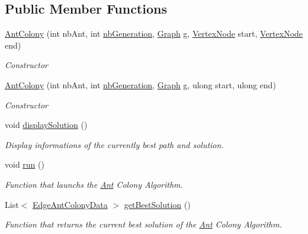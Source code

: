 \subsection*{Public Member Functions}
\begin{DoxyCompactItemize}
\item 
\hyperlink{classAntColony_aa06b5e0e15bfd614ded65d2360d8a79d}{Ant\+Colony} (int nb\+Ant, int \hyperlink{classAntColony_a8c57e1c9b4292d9efa2b9706c48dc55c}{nb\+Generation}, \hyperlink{classGraph}{Graph} g, \hyperlink{classVertexNode}{Vertex\+Node} start, \hyperlink{classVertexNode}{Vertex\+Node} end)
\begin{DoxyCompactList}\small\item\em Constructor \end{DoxyCompactList}\item 
\hyperlink{classAntColony_ac7d4c63ec6ef39e3cd63dc3068292172}{Ant\+Colony} (int nb\+Ant, int \hyperlink{classAntColony_a8c57e1c9b4292d9efa2b9706c48dc55c}{nb\+Generation}, \hyperlink{classGraph}{Graph} g, ulong start, ulong end)
\begin{DoxyCompactList}\small\item\em Constructor \end{DoxyCompactList}\item 
void \hyperlink{classAntColony_a64b52d3b6d145d8461ba71de83bf1a54}{display\+Solution} ()
\begin{DoxyCompactList}\small\item\em Display informations of the currently best path and solution. \end{DoxyCompactList}\item 
void \hyperlink{classAntColony_a479ced179ce876bae6dfdbcc3f7e03d4}{run} ()
\begin{DoxyCompactList}\small\item\em Function that launchs the \hyperlink{classAnt}{Ant} Colony Algorithm. \end{DoxyCompactList}\item 
List$<$ \hyperlink{classEdgeAntColonyData}{Edge\+Ant\+Colony\+Data} $>$ \hyperlink{classAntColony_a695a3b069186ee619e405a684304afcf}{get\+Best\+Solution} ()
\begin{DoxyCompactList}\small\item\em Function that returns the current best solution of the \hyperlink{classAnt}{Ant} Colony Algorithm. \end{DoxyCompactList}\end{DoxyCompactItemize}
